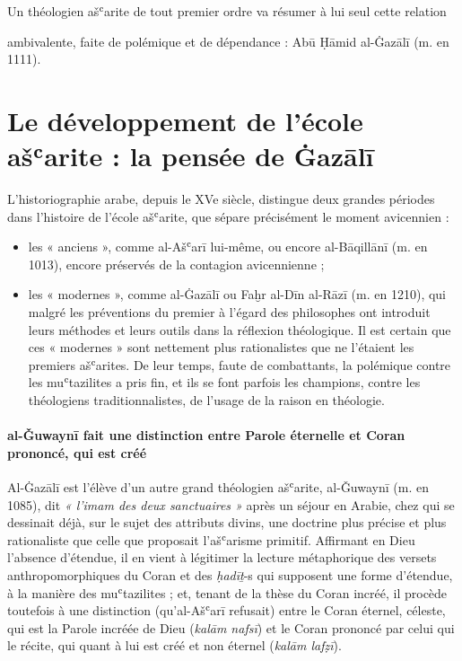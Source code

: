 Un théologien ašʿarite de tout premier ordre va résumer à lui seul cette
relation

ambivalente, faite de polémique et de dépendance : Abū Ḥāmid al-Ġazālī
(m. en 1111).


\hypertarget{le-duxe9veloppement-de-luxe9cole-aux161ux2bfarite-la-pensuxe9e-de-ux121azux101lux12b}{%
\section{Le développement de l'école ašʿarite : la pensée de
Ġazālī}\label{le-duxe9veloppement-de-luxe9cole-aux161ux2bfarite-la-pensuxe9e-de-ux121azux101lux12b}}


L'historiographie arabe, depuis le XVe siècle, distingue deux grandes
périodes dans l'histoire de l'école ašʿarite, que sépare précisément le
moment avicennien :


\begin{itemize}
\item
  
  les « anciens », comme al-Ašʿarī lui-même, ou encore al-Bāqillānī (m.
  en 1013), encore préservés de la contagion avicennienne ;
    
\item
  
  les « modernes », comme al-Ġazālī ou Faḫr al-Dīn al-Rāzī (m. en 1210),
  qui malgré les préventions du premier à l'égard des philosophes ont
  introduit leurs méthodes et leurs outils dans la réflexion
  théologique. Il est certain que ces « modernes » sont nettement plus
  rationalistes que ne l'étaient les premiers ašʿarites. De leur temps,
  faute de combattants, la polémique contre les muʿtazilites a pris fin,
  et ils se font parfois les champions, contre les théologiens
  traditionnalistes, de l'usage de la raison en théologie.
  
\end{itemize}


\paragraph{al-Ǧuwaynī fait une distinction entre Parole éternelle et Coran prononcé, qui est créé}Al-Ġazālī est l'élève d'un autre grand théologien ašʿarite, al-Ǧuwaynī
(m. en 1085), dit
\textit{« l'imam des deux sanctuaires »} après un séjour en Arabie, chez qui se
dessinait déjà, sur le
sujet des attributs divins, une doctrine plus précise et plus
rationaliste que celle que proposait l'ašʿarisme primitif. Affirmant en
Dieu l'absence d'étendue, il en vient à légitimer la lecture
métaphorique des versets anthropomorphiques du Coran et des
\emph{ḥadīṯ}-s qui supposent une forme d'étendue, à la manière des
muʿtazilites ; et, tenant de la thèse du Coran incréé, il procède
toutefois à une distinction (qu'al-Ašʿarī refusait) entre le Coran
éternel, céleste, qui est la Parole incréée de Dieu (\emph{kalām nafsī})
et le Coran prononcé par celui qui le récite, qui quant à lui est créé
et non éternel (\emph{kalām lafẓī}).

